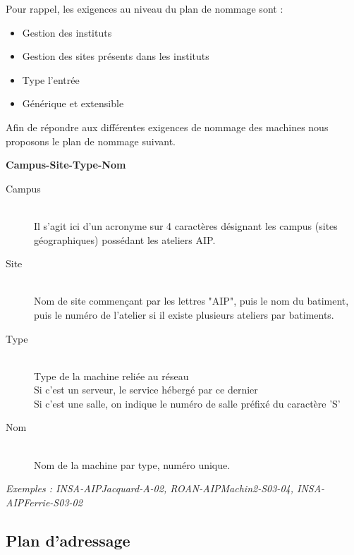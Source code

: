 \documentclass[a4paper]{article}
\begin{document}
	Pour rappel, les exigences au niveau du plan de nommage sont :\\
	\begin{itemize}
	\item Gestion des instituts
	\item Gestion des sites présents dans les instituts
	\item Type l'entrée
	\item Générique et extensible
	\end{itemize}	

	Afin de répondre aux différentes exigences de nommage des machines nous proposons le plan de nommage suivant.	
	
	\textbf{Campus-Site-Type-Nom}	
	
	\begin{description}
	\item[Campus]\hfill\\
	Il s'agit ici d'un acronyme sur 4 caractères désignant les campus (sites géographiques) possédant les ateliers AIP.\\
	
	\item[Site]\hfill\\
	Nom de site commençant par les lettres "AIP", puis le nom du batiment, puis le numéro de l'atelier si il existe plusieurs ateliers par batiments.
	
	\item[Type]\hfill\\
	Type de la machine reliée au réseau\\
	Si c'est un serveur, le service hébergé par ce dernier\\
	Si c'est une salle, on indique le numéro de salle préfixé du caractère 'S'\\
	
	\item[Nom]\hfill\\
	Nom de la machine par type, numéro unique.
	\end{description}	
	
	\textit{Exemples : INSA-AIPJacquard-A-02, ROAN-AIPMachin2-S03-04, INSA-AIPFerrie-S03-02}	
	
	\subsection{Plan d'adressage}
	
	
	
\end{document}
